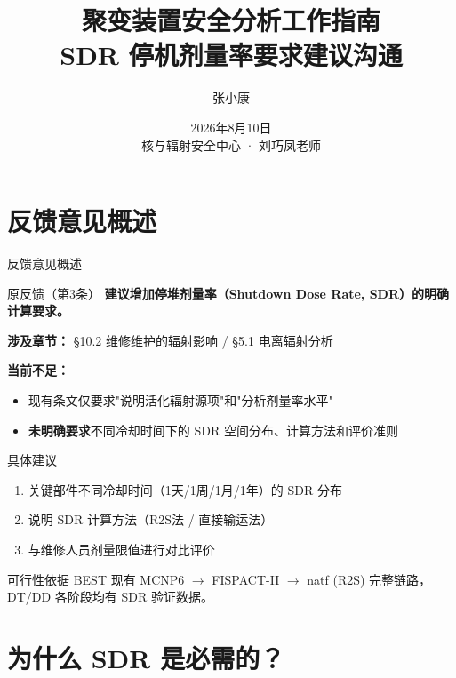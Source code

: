 \documentclass[aspectratio=169]{ctexbeamer}
\title{聚变装置安全分析工作指南 \\ SDR 停机剂量率要求建议沟通}
\author{张小康}
\institute{中国科学院等离子体物理研究所}
\date{2026年8月10日 \\ 核与辐射安全中心 · 刘巧凤老师}
\begin{document}
\frame{\titlepage}

\section{反馈意见概述}

\begin{frame}{反馈意见概述}
	\begin{block}{原反馈（第3条）}
		\textbf{建议增加停堆剂量率（Shutdown Dose Rate, SDR）的明确计算要求。}
	\end{block}
	\vspace{4pt}
	\textbf{涉及章节：} §10.2 维修维护的辐射影响 / §5.1 电离辐射分析

	\vspace{8pt}
	\textbf{当前不足：}
	\begin{itemize}
		\item 现有条文仅要求"说明活化辐射源项"和"分析剂量率水平"
		\item \textbf{未明确要求}不同冷却时间下的 SDR 空间分布、计算方法和评价准则
	\end{itemize}
\end{frame}

\begin{frame}{具体建议}
	\begin{enumerate}
		\item[(a)] 关键部件不同冷却时间（1天/1周/1月/1年）的 SDR 分布
		\item[(b)] 说明 SDR 计算方法（R2S法 / 直接输运法）
		\item[(c)] 与维修人员剂量限值进行对比评价
	\end{enumerate}

	\vspace{12pt}
	\begin{block}{可行性依据}
		BEST 现有 MCNP6 $\to$ FISPACT-II $\to$ natf (R2S) 完整链路，DT/DD 各阶段均有 SDR 验证数据。
	\end{block}
\end{frame}

\section{为什么 SDR 是必需的？}
\end{document}
